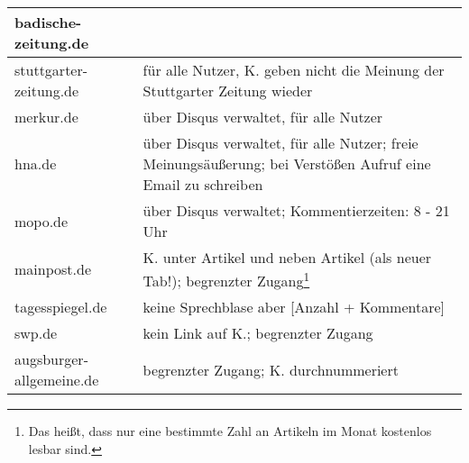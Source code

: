 \begin{longtable}{lp{10cm}}
badische-zeitung.de &
  \\\midrule

stuttgarter-zeitung.de &
  für alle Nutzer, K. geben nicht die Meinung der Stuttgarter Zeitung
  wieder\\\midrule

merkur.de &
  über Disqus verwaltet, für alle Nutzer\\\midrule

hna.de &
  über Disqus verwaltet, für alle Nutzer; freie Meinungsäußerung; bei Verstößen
  Aufruf eine Email zu schreiben \\\midrule

mopo.de &
  über Disqus verwaltet; Kommentierzeiten: 8 - 21 Uhr\\\midrule

mainpost.de &
  K. unter Artikel und neben Artikel (als neuer Tab!); begrenzter
  Zugang\footnote{Das heißt, dass nur eine bestimmte Zahl an Artikeln im Monat
  kostenlos lesbar sind.}\\\midrule

tagesspiegel.de &
  keine Sprechblase aber [Anzahl + Kommentare]\\\midrule

swp.de &
  kein Link auf K.; begrenzter Zugang\\\midrule

augsburger-allgemeine.de &
  begrenzter Zugang; K. durchnummeriert
\end{longtable}
\endgroup

